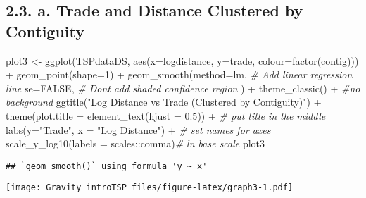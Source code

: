 \documentclass[
]{article}
\newenvironment{Shaded}{\begin{snugshade}}{\end{snugshade}}
\newcommand{\AttributeTok}[1]{\textcolor[rgb]{0.77,0.63,0.00}{#1}}
\newcommand{\CommentTok}[1]{\textcolor[rgb]{0.56,0.35,0.01}{\textit{#1}}}
\newcommand{\ConstantTok}[1]{\textcolor[rgb]{0.00,0.00,0.00}{#1}}
\newcommand{\DecValTok}[1]{\textcolor[rgb]{0.00,0.00,0.81}{#1}}
\newcommand{\FloatTok}[1]{\textcolor[rgb]{0.00,0.00,0.81}{#1}}
\newcommand{\FunctionTok}[1]{\textcolor[rgb]{0.00,0.00,0.00}{#1}}
\newcommand{\NormalTok}[1]{#1}
\newcommand{\OtherTok}[1]{\textcolor[rgb]{0.56,0.35,0.01}{#1}}
\newcommand{\SpecialCharTok}[1]{\textcolor[rgb]{0.00,0.00,0.00}{#1}}
\newcommand{\StringTok}[1]{\textcolor[rgb]{0.31,0.60,0.02}{#1}}
\begin{document}
\hypertarget{a.-trade-and-distance-clustered-by-contiguity}{%
\subsection{2.3. a. Trade and Distance Clustered by
Contiguity}\label{a.-trade-and-distance-clustered-by-contiguity}}

\begin{Shaded}
\begin{Highlighting}[]
\NormalTok{plot3 }\OtherTok{\textless{}{-}} \FunctionTok{ggplot}\NormalTok{(TSPdataDS, }\FunctionTok{aes}\NormalTok{(}\AttributeTok{x=}\NormalTok{logdistance,}
                         \AttributeTok{y=}\NormalTok{trade, }\AttributeTok{colour=}\FunctionTok{factor}\NormalTok{(contig))) }\SpecialCharTok{+}
                        \FunctionTok{geom\_point}\NormalTok{(}\AttributeTok{shape=}\DecValTok{1}\NormalTok{) }\SpecialCharTok{+} 
                        \FunctionTok{geom\_smooth}\NormalTok{(}\AttributeTok{method=}\NormalTok{lm, }\CommentTok{\# Add linear regression line}
                                \AttributeTok{se=}\ConstantTok{FALSE}\NormalTok{,   }\CommentTok{\# Don\textquotesingle{}t add shaded confidence region}
\NormalTok{                                ) }\SpecialCharTok{+} 
                        \FunctionTok{theme\_classic}\NormalTok{() }\SpecialCharTok{+} \CommentTok{\#no background}
                        \FunctionTok{ggtitle}\NormalTok{(}\StringTok{"Log Distance vs Trade (Clustered by Contiguity)"}\NormalTok{) }\SpecialCharTok{+}
                        \FunctionTok{theme}\NormalTok{(}\AttributeTok{plot.title =} \FunctionTok{element\_text}\NormalTok{(}\AttributeTok{hjust =} \FloatTok{0.5}\NormalTok{)) }\SpecialCharTok{+} \CommentTok{\# put title in the middle}
                        \FunctionTok{labs}\NormalTok{(}\AttributeTok{y=}\StringTok{"Trade"}\NormalTok{, }\AttributeTok{x =} \StringTok{"Log Distance"}\NormalTok{) }\SpecialCharTok{+} \CommentTok{\# set names for axes}
                        \FunctionTok{scale\_y\_log10}\NormalTok{(}\AttributeTok{labels =}\NormalTok{ scales}\SpecialCharTok{::}\NormalTok{comma)}\CommentTok{\# ln base scale}
\NormalTok{plot3}
\end{Highlighting}
\end{Shaded}

\begin{verbatim}
## `geom_smooth()` using formula 'y ~ x'
\end{verbatim}

\texttt{[image: Gravity\_introTSP\_files/figure-latex/graph3-1.pdf]}
\end{document}
